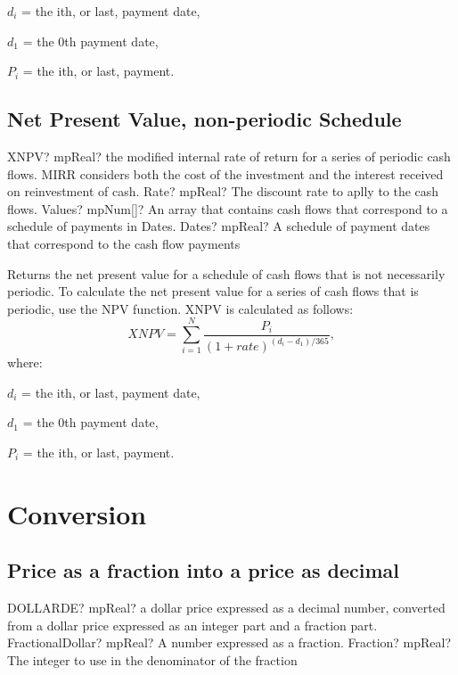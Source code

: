$d_i$ = the ith, or last, payment date,

$d_1$ = the 0th payment date,

$P_i$ = the ith, or last, payment.




\subsection{Net Present Value, non-periodic Schedule}


\begin{mpFunctionsExtract}
	\mpWorksheetFunctionThreeNotImplemented
	{XNPV? mpReal? the modified internal rate of return for a series of periodic cash flows. MIRR considers both the cost of the investment and the interest received on reinvestment of cash.}
	{Rate? mpReal? The discount rate to aplly to the cash flows.}
	{Values? mpNum[]? An array that contains cash flows that correspond to a schedule of payments in Dates.}
	{Dates? mpReal? A schedule of payment dates that correspond to the cash flow payments}
\end{mpFunctionsExtract}

\vspace{0.3cm}
Returns the net present value for a schedule of cash flows that is not necessarily periodic. To calculate the net present value for a series of cash flows that is periodic, use the NPV function. XNPV is calculated as follows: 
\begin{equation}
	XNPV = \sum_{i=1}^N \frac{P_i}{(1+rate)^{(d_i-d_1)/365}},
\end{equation}
where:

$d_i$ = the ith, or last, payment date,

$d_1$ = the 0th payment date,

$P_i$ = the ith, or last, payment.



\newpage
\section{Conversion}

\subsection{Price as a fraction into a price as decimal}

\begin{mpFunctionsExtract}
	\mpWorksheetFunctionTwoNotImplemented
	{DOLLARDE? mpReal? a dollar price expressed as a decimal number, converted from a dollar price expressed as an integer part and a fraction part.}
	{FractionalDollar? mpReal? A number expressed as a fraction.}
	{Fraction? mpReal? The integer to use in the denominator of the fraction}
\end{mpFunctionsExtract}

